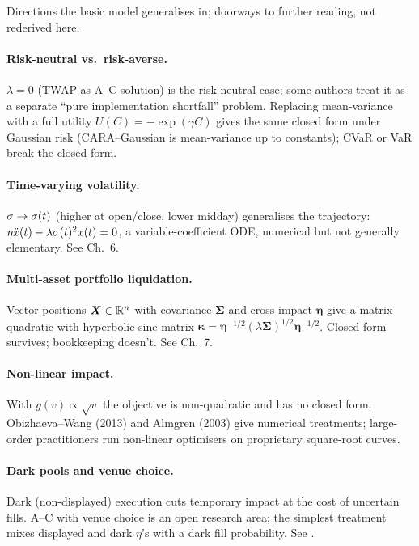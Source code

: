 Directions the basic model generalises in; doorways to further
reading, not rederived here.

\paragraph{Risk-neutral vs.\ risk-averse.} $\lambda = 0$ (TWAP as
A--C solution) is the risk-neutral case; some authors treat it as
a separate ``pure implementation shortfall'' problem. Replacing
mean-variance with a full utility $U(C) = -\exp(\gamma C)$ gives
the same closed form under Gaussian risk (CARA--Gaussian is
mean-variance up to constants); CVaR or VaR break the closed form.

\paragraph{Time-varying volatility.} $\sigma \to \sigma(t)$
(higher at open/close, lower midday) generalises the trajectory:
$\eta\ddot{x}(t) - \lambda\sigma(t)^2 x(t) = 0$, a variable-coefficient
ODE, numerical but not generally elementary. See \citeCartea{}
Ch.~6.

\paragraph{Multi-asset portfolio liquidation.} Vector positions
$\bm{X} \in \mathbb{R}^n$ with covariance $\bm{\Sigma}$ and cross-impact
$\bm{\eta}$ give a matrix quadratic with hyperbolic-sine matrix
$\bm{\kappa} = \bm{\eta}^{-1/2}(\lambda\bm{\Sigma})^{1/2}\bm{\eta}^{-1/2}$.
Closed form survives; bookkeeping doesn't. See \citeCartea{}
Ch.~7.

\paragraph{Non-linear impact.} With $g(v) \propto \sqrt{v}$ the
objective is non-quadratic and has no closed form. Obizhaeva--Wang
(2013) and Almgren (2003) give numerical treatments;
large-order practitioners run non-linear optimisers on proprietary
square-root curves.

\paragraph{Dark pools and venue choice.} Dark (non-displayed)
execution cuts temporary impact at the cost of uncertain fills.
A--C with venue choice is an open research area; the simplest
treatment mixes displayed and dark $\eta$'s with a dark fill
probability. See \citeBouchaud{}.

